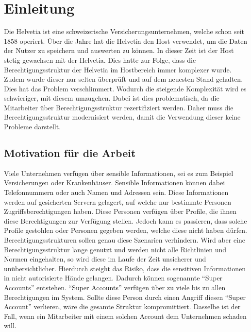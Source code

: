 \chapter{Einleitung}
\label{ch:intro}
Die Helvetia ist eine schweizerische Versicherungsunternehmen, welche schon seit 1858 operiert. \cite{Helv}
Über die Jahre hat die Helvetia den Host verwendet, um die Daten der Nutzer zu speichern und auswerten zu können.
In dieser Zeit ist der Host stetig gewachsen mit der Helvetia.
Dies hatte zur Folge, dass die Berechtigungsstruktur der Helvetia im Hostbereich immer komplexer wurde.
Zudem wurde dieser nur selten überprüft und auf dem neuesten Stand gehalten.
Dies hat das Problem verschlimmert.
Wodurch die steigende Komplexität wird es schwieriger, mit diesem umzugehen.
Dabei ist dies problematisch, da die Mitarbeiter über Berechtigungsstruktur rezertifiziert werden.
Daher muss die Berechtigungsstruktur modernisiert werden, damit die Verwendung dieser keine Probleme darstellt.

\section{Motivation für die Arbeit}
\label{sec:intro:motivation}
Viele Unternehmen verfügen über sensible Informationen, sei es zum Beispiel Versicherungen oder Krankenhäuser.
Sensible Informationen können dabei Telefonnummern oder auch Namen und Adressen sein.
Diese Informationen werden auf gesicherten Servern gelagert, auf welche nur bestimmte Personen Zugriffsberechtigungen haben.
Diese Personen verfügen über Profile, die ihnen diese Berechtigungen zur Verfügung stellen.
Jedoch kann es passieren, dass solche Profile gestohlen oder Personen gegeben werden, welche diese nicht haben dürfen.
Berechtigungsstrukturen sollen genau diese Szenarien verhindern.
Wird aber eine Berechtigungsstruktur lange genutzt und werden nicht alle Richtlinien und Normen eingehalten, so wird diese im Laufe der Zeit unsicherer und unübersichtlicher.
Hierdurch steight das Risiko, dass die sensitiven Informationen in nicht autorisierte Hände gelangen.
Dadurch können sogenannte "`Super Accounts"' entstehen.
"`Super Accounts"' verfügen über zu viele bis zu allen Berechtigungen im System.
Sollte diese Person durch einen Angriff diesen "`Super Account"' verlieren, wäre die gesamte Struktur kompromittiert.
Dasselbe ist der Fall, wenn ein Mitarbeiter mit einem solchen Account dem Unternehmen schaden will.

